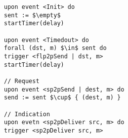 \begin{lstlisting}[caption= Stubborn link interface, mathescape, captionpos=b]
upon event <Init> do
sent := $\empty$
startTimer(delay)

upon event <Timedout> do
forall (dst, m) $\in$ sent do
trigger <flp2pSend | dst, m>
startTimer(delay)

// Request
upon event <sp2pSend | dest, m> do
send := sent $\cup$ { (dest, m) }

// Indication
upon evetn <sp2pDeliver src, m> do
trigger <sp2pDeliver src, m>
\end{lstlisting}
